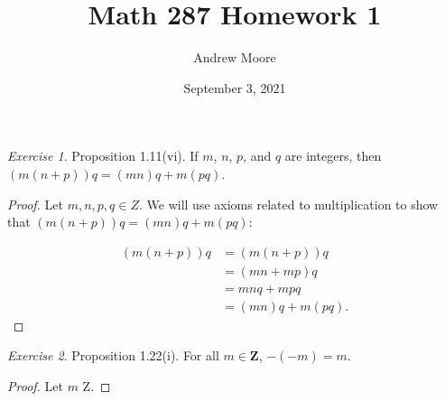 \documentclass[12pt,oneside]{amsart}
\title{Math 287 Homework 1}
\author{Andrew Moore}
\date{September 3, 2021} %
\theoremstyle{remark}
\newtheorem{exer}{Exercise}
\begin{document}
\maketitle

\newpage
\begin{exer}
Proposition 1.11(vi). If $m$, $n$, $p$, and $q$ are integers, then \newline
$(m(n+p))q = (mn)q + m(pq)$.
\end{exer}

\begin{proof}
Let $m, n, p, q \in Z.$ We will use axioms related to multiplication to show that $(m(n + p))q = (mn)q + m(pq):$

\begin{align*}
(m(n + p))q &= (m(n + p))q \\
            &= (mn + mp)q \tag{Axiom 1.1.3} \\
            &= mnq + mpq \tag{Axiom 1.1.3} \\
            &= (mn)q + m(pq). \tag{Axiom 1.1.5}
\end{align*}
\end{proof}

\newpage
\begin{exer}
Proposition 1.22(i). For all $m \in \mathbf{Z}$, $-(-m) = m$.
\end{exer}

\begin{proof}
Let $m$ \in Z.
\end{proof}
\end{document}

